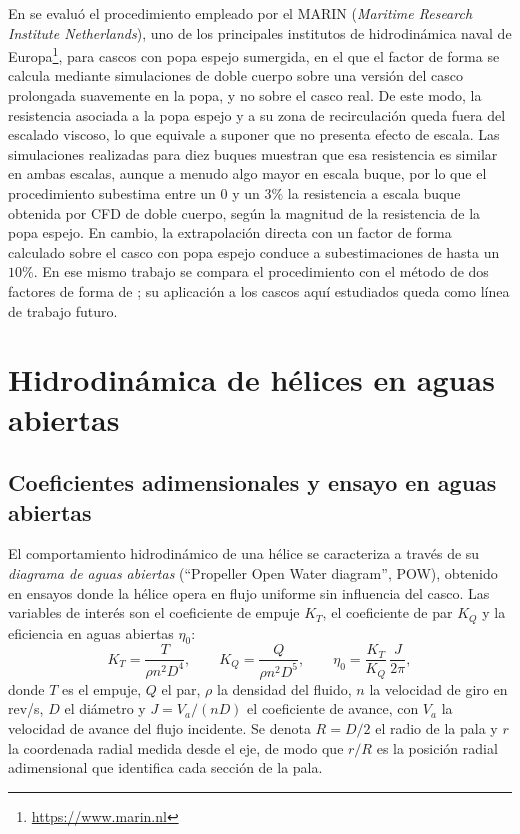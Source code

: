 En \citet{starke2025} se evaluó el procedimiento empleado por el MARIN
(\emph{Maritime Research Institute Netherlands}), uno de los principales
institutos de hidrodinámica naval de Europa\footnote{\url{https://www.marin.nl}},
para cascos con popa espejo sumergida, en el que el factor de forma se calcula
mediante simulaciones de doble cuerpo sobre una versión del casco prolongada
suavemente en la popa, y no sobre el casco real. De este modo, la resistencia
asociada a la popa espejo y a su zona de recirculación queda fuera del escalado
viscoso, lo que equivale a suponer que no presenta efecto de escala. Las
simulaciones realizadas para diez buques muestran que esa resistencia es similar
en ambas escalas, aunque a menudo algo mayor en escala buque, por lo que el
procedimiento subestima entre un $0$ y un $3\%$ la resistencia a escala buque
obtenida por CFD de doble cuerpo, según la magnitud de la resistencia de la popa
espejo. En cambio, la extrapolación directa con un factor de forma calculado
sobre el casco con popa espejo conduce a subestimaciones de hasta un $10\%$.
En ese mismo trabajo se compara el procedimiento con el método de dos factores
de forma de \citet{korkmaz_wetted_transom}; su aplicación a los cascos aquí
estudiados queda como línea de trabajo futuro.
 
 
\section{Hidrodinámica de hélices en aguas abiertas}
\label{sec:helices_antec}
 
\subsection{Coeficientes adimensionales y ensayo en aguas abiertas}
\label{sec:pow_antec}
 
El comportamiento hidrodinámico de una hélice se caracteriza a través de su \emph{diagrama de aguas abiertas} (``Propeller Open Water diagram'', POW), obtenido en ensayos donde la hélice opera en flujo uniforme sin influencia del casco. Las variables de interés son el coeficiente de empuje $K_T$, el coeficiente de par $K_Q$ y la eficiencia en aguas abiertas $\eta_0$:
%
\begin{equation}
    K_T = \frac{T}{\rho n^2 D^4}, \qquad
    K_Q = \frac{Q}{\rho n^2 D^5}, \qquad
    \eta_0 = \frac{K_T}{K_Q}\,\frac{J}{2\pi},
\end{equation}
%
donde $T$ es el empuje, $Q$ el par, $\rho$ la densidad del fluido, $n$ la velocidad de giro en rev/s, $D$ el diámetro y $J = V_a/(nD)$ el coeficiente de avance, con $V_a$ la velocidad de avance del flujo incidente. Se denota $R = D/2$ el radio de la pala y $r$ la coordenada radial medida desde el eje, de modo que $r/R$ es la posición radial adimensional que identifica cada sección de la pala.

